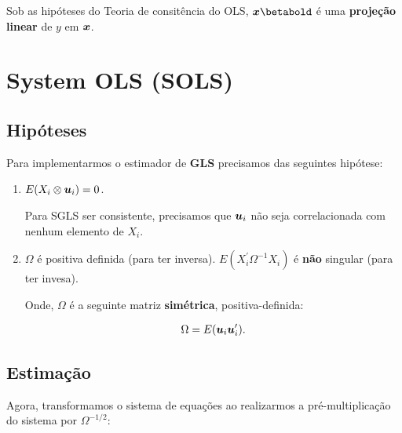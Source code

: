 \documentclass[11pt,oneside,a4paper]{article}
\numberwithin{equation}{section}
\begin{document}
Sob as hipóteses do Teoria de consitência do OLS, $\mbs{x} \betabold$ é uma \textbf{projeção linear} de $y$ em $\boldsymbol{x}$.


\clearpage
\section{System OLS (SOLS)}

\noindent
\citet[C.7 -- The Single-Equation Linear Model and OLS Estimation]{wool-2010}

\noindent
\citet[C.10 -- The Single-Equation Linear Model and OLS Estimation]{wool-2010}

\clearpage
\subsection*{Hipóteses}

Para implementarmos o estimador de \textbf{GLS} precisamos das seguintes hipótese:

\begin{enumerate}
\item %

$E(X_{i} \otimes \boldsymbol{u}_{i}) = 0$.

Para SGLS ser consistente, precisamos que $\boldsymbol{u}_{i}$ não seja correlacionada com nenhum elemento de $X_{i}$.

\item %

$\Omega$ é positiva definida (para ter inversa).
$E(X_{i}^{\prime} \Omega^{-1} X_{i})$ é \textbf{não} singular (para ter invesa).

Onde, $\Omega$ é a seguinte matriz \textbf{simétrica}, positiva-definida:

\vspace{-1.5 em}
\begin{align*}
\Omega = E(\boldsymbol{u}_{i} \boldsymbol{u}_{i}^{\prime}).
\end{align*}
\end{enumerate}

\subsection*{Estimação}

Agora, transformamos o sistema de equações ao realizarmos a pré-multiplicação do sistema por $\Omega^{-1/2}$:
\end{document}

